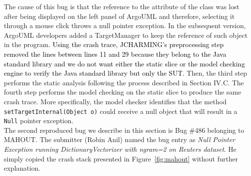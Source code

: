 \documentclass[times, doublespace]{smrauth}
\newcommand{\red}[1]{\textcolor{black}{#1}}
\begin{document}
The cause of this bug is that the reference to the attribute of
the class was lost after being displayed on the left panel of
ArgoUML and therefore, selecting it through a mouse click
throws a null pointer exception. In the subsequent version,
ArgoUML developers added a TargetManager to keep the
reference of such object in the program. \red{Using the crash trace, JCHARMING's preprocessing step
removed the lines between lines 11 and 29 because they
belong to the Java standard library and we do not want either
the static slice or the model checking engine to verify the
Java standard library but only the SUT.} Then, the third step
performs the static analysis following the process described in
Section IV.C. The fourth step performs the model checking on
the static slice to produce the same crash trace. More
specifically, the model checker identifies that the method
{\tt setTargetInternal(Object o)} could receive a null object that
will result in a {\tt Null} pointer exception. \\

The second reproduced bug we describe in this section is Bug \#486 belonging to MAHOUT. The submitter (Robin Anil) named the bug entry as {\it Null Pointer Exception running DictionaryVectorizer with ngram=2 on Reuters dataset}. He simply copied the crash stack presented in Figure~\ref{fig:mahout} without further explanation.
\end{document}
